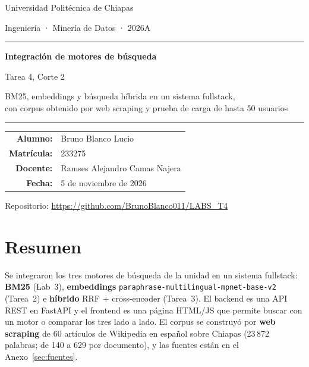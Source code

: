 \documentclass[11pt,letterpaper]{article}
\newcommand{\alumno}{Bruno Blanco Lucio}
\newcommand{\matricula}{233275}
\newcommand{\docente}{Ramses Alejandro Camas Najera}
\newcommand{\repo}{https://github.com/BrunoBlanco011/LABS_T4}
\newcommand{\term}[1]{\texttt{#1}}
\begin{document}
\begin{titlepage}
\centering
{\large Universidad Politécnica de Chiapas\par}
\vspace{0.3cm}
{\normalsize Ingeniería · Minería de Datos · 2026A\par}
\vspace{3cm}
{\color{azul}\rule{\linewidth}{1.2pt}\par}
\vspace{0.4cm}
{\LARGE\bfseries Integración de motores de búsqueda\par}
\vspace{0.3cm}
{\Large Tarea 4, Corte 2\par}
\vspace{0.3cm}
{\normalsize BM25, embeddings y búsqueda híbrida en un sistema fullstack,\\ con corpus obtenido por web scraping y prueba de carga de hasta 50 usuarios\par}
{\color{azul}\rule{\linewidth}{1.2pt}\par}
\vspace{3cm}
\begin{tabular}{rl}
\textbf{Alumno:} & \alumno \\
\textbf{Matrícula:} & \matricula \\
\textbf{Docente:} & \docente \\
\textbf{Fecha:} & 5 de noviembre de 2026 \\
\end{tabular}
\vfill
{\small Repositorio: \url{\repo}\par}
\end{titlepage}

\section*{Resumen}

Se integraron los tres motores de búsqueda de la unidad en un sistema fullstack: \textbf{BM25} (Lab~3), \textbf{embeddings} \term{paraphrase-multilingual-mpnet-base-v2} (Tarea~2) e \textbf{híbrido} RRF + cross-encoder (Tarea~3). El backend es una API REST en FastAPI y el frontend es una página HTML/JS que permite buscar con un motor o comparar los tres lado a lado. El corpus se construyó por \textbf{web scraping} de 60 artículos de Wikipedia en español sobre Chiapas (23\,872 palabras; de 140 a 629 por documento), y las fuentes están en el Anexo~\ref{sec:fuentes}.
\end{document}
